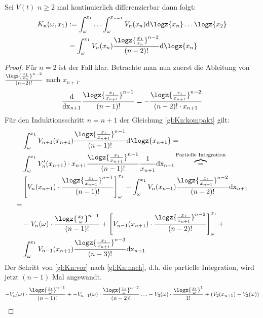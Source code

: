 \begin{lemma}
Sei $V(t)$ $n \geq 2$ mal kontinuierlich differenzierbar dann folgt: 
	\begin{align}
		K_n(\omega, x_1) &:= \int_{\omega}^{x_1} \hdots \int_{\omega}^{x_{n-1}} V_n(x_n) \mathrm{d} \logz{x_n} \hdots \logz{x_2}\label{gl:Kn:large}\\
						 &= \int_{\omega}^{x_1} V_n(x_n) \frac{\logz{\frac{x_1}{x_n}}^{n-2}}{(n-2)!} \mathrm{d} \logz{x_n}\label{gl:Kn:kompakt}
	\end{align}
	\begin{proof}
		Für $n=2$ ist der Fall klar. Betrachte man nun zuerst die Ableitung von $\frac{\logz{\frac{x_1}{x_n}}^{n-2}}{(n-2)!}\label{gl:abl}$ nach $x_{n+1}$. 
		\begin{align}
			\frac{\mathrm{d}}{\mathrm{dx}_{n+1}} \frac{\logz{\frac{x_1}{x_{n+1}}}^{n-1}}{(n-1)!} = -\frac{\logz{\frac{x_1}{x_{n+1}}}^{n-2}}{(n-2)! \cdot x_{n+1}}
		\end{align}
		Für den Induktionsschritt $n = n + 1$ der Gleichung \ref{gl:Kn:kompakt} gilt:
		\begin{align}
			&\int_{\omega}^{x_1} V_{n+1}(x_{n+1}) \frac{\logz{\frac{x_1}{x_{n+1}}}^{n-1}}{(n-1)!} \mathrm{d} \logz{x_{n+1}} = \\
			&\int_{\omega}^{x_1} V'_{n}(x_{n+1}) \cdot x_{n+1} \frac{\logz{\frac{x_1}{x_{n+1}}}^{n-1}}{(n-1)!} \frac{1}{x_{n+1}}  \mathrm{d x_{n+1}} \overbrace{=}^{\text{Partielle Integration}}\label{gl:Kn:vor}\\
			&\left[V_n(x_{n+1}) \cdot \frac{\logz{\frac{x_1}{x_{n+1}}}^{n-1}}{(n-1)!}\right]^{x_1}_{\omega} - \int_{\omega}^{x_1} {V_n(x_{n+1}) \frac{\logz{\frac{x_1}{x_{n+1}}}^{n-2}}{(n-2)!}} \mathrm{dx}_{n+1} \label{gl:Kn:nach}\\= \\
			&-V_n(\omega) \cdot \frac{\logz{\frac{x_1}{\omega}}^{n-1}}{(n-1)!} + \left[V_{n-1}(x_{n+1}) \cdot \frac{\logz{\frac{x_1}{x_{n+1}}}^{n-2}}{(n-2)!}\right]^{x_1}_{\omega} + \\
			&\int_{\omega}^{x_1} {V_{n-1}(x_{n+1}) \frac{\logz{\frac{x_1}{x_{n+1}}}^{n-3}}{(n-3)!}} \mathrm{dx}_{n+1} \\
		\end{align}
		Der Schritt von \ref{gl:Kn:vor} nach \ref{gl:Kn:nach}, d.h. die partielle Integration, wird jetzt $(n-1)$ Mal angewandt.
		\begin{align}
		-V_n(\omega) \cdot \frac{\logz{\frac{x_1}{\omega}}^{n-1}}{(n-1)!} + -V_{n-1}(\omega) \cdot \frac{\logz{\frac{x_1}{\omega}}^{n-2}}{(n-2)!} \hdots -V_3(\omega) \cdot \frac{\logz{\frac{x_1}{\omega}}^{1}}{1!} + (V_2(x_{n+1}) - V_2(\omega))\label{gl:Kn:End}

\end{align}
\end{proof}
\end{lemma}
